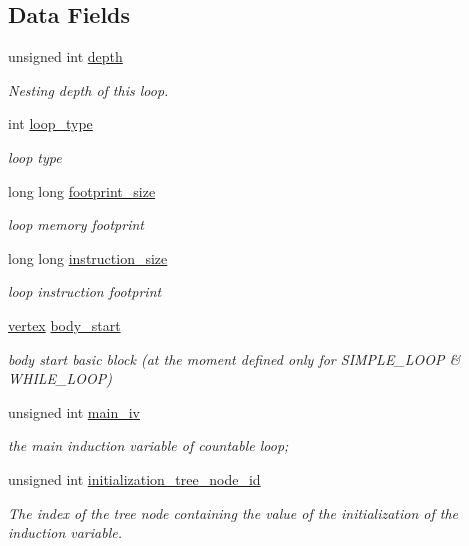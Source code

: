\subsection*{Data Fields}
\begin{DoxyCompactItemize}
\item 
unsigned int \hyperlink{classLoop_a3638f95a57821ebfcdb09eb4c140ed4c}{depth}
\begin{DoxyCompactList}\small\item\em Nesting depth of this loop. \end{DoxyCompactList}\item 
int \hyperlink{classLoop_a9fc5bf34e3b83e67b52e2b1b4d2f6fbb}{loop\+\_\+type}
\begin{DoxyCompactList}\small\item\em loop type \end{DoxyCompactList}\item 
long long \hyperlink{classLoop_a7a4fbb2bed01020027499ea1a6324914}{footprint\+\_\+size}
\begin{DoxyCompactList}\small\item\em loop memory footprint \end{DoxyCompactList}\item 
long long \hyperlink{classLoop_ab23c3fe7f84394f044732bcfb4974c7e}{instruction\+\_\+size}
\begin{DoxyCompactList}\small\item\em loop instruction footprint \end{DoxyCompactList}\item 
\hyperlink{graph_8hpp_abefdcf0544e601805af44eca032cca14}{vertex} \hyperlink{classLoop_a5ca51d72db12762959560dabdca7b46d}{body\+\_\+start}
\begin{DoxyCompactList}\small\item\em body start basic block (at the moment defined only for S\+I\+M\+P\+L\+E\+\_\+\+L\+O\+OP \& W\+H\+I\+L\+E\+\_\+\+L\+O\+OP) \end{DoxyCompactList}\item 
unsigned int \hyperlink{classLoop_a4219dae712820c72a62df2a091c1141a}{main\+\_\+iv}
\begin{DoxyCompactList}\small\item\em the main induction variable of countable loop; \end{DoxyCompactList}\item 
unsigned int \hyperlink{classLoop_a16e71b2baa9aad702a0ae748b2d6a5c3}{initialization\+\_\+tree\+\_\+node\+\_\+id}
\begin{DoxyCompactList}\small\item\em The index of the tree node containing the value of the initialization of the induction variable. \end{DoxyCompactList}\item 

\end{DoxyCompactItemize}
